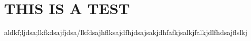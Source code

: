 \section{THIS IS A TEST}
aldkf;ljdsa;lkfkdsajfjdsa/lkfdsajhflksajdfhjdsajsakjdhfafkjsalkjfalkjdlfhdsajflslkj
